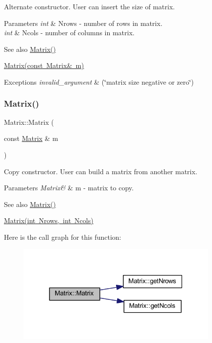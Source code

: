 Alternate constructor. User can insert the size of matrix. 
\begin{DoxyParams}{Parameters}
{\em int} & Nrows -\/ number of rows in matrix. \\
\hline
{\em int} & Ncols -\/ number of columns in matrix. \\
\hline
\end{DoxyParams}
\begin{DoxySeeAlso}{See also}
\mbox{\hyperlink{class_matrix_a2dba13c45127354c9f75ef576f49269b}{Matrix()}} 

\mbox{\hyperlink{class_matrix_a765f4dcb51b6829311cc3e7576388423}{Matrix(const Matrix\& m)}} 
\end{DoxySeeAlso}

\begin{DoxyExceptions}{Exceptions}
{\em invalid\+\_\+argument} & (\char`\"{}matrix size negative or zero\char`\"{}) \\
\hline
\end{DoxyExceptions}
\mbox{\label{class_matrix_a765f4dcb51b6829311cc3e7576388423}} 
\subsubsection{\texorpdfstring{Matrix()}{Matrix()}\hspace{0.1cm}{\footnotesize\ttfamily [3/3]}}
{\footnotesize\ttfamily Matrix\+::\+Matrix (\begin{DoxyParamCaption}\item[{const \mbox{\hyperlink{class_matrix}{Matrix}} \&}]{m }\end{DoxyParamCaption})}

Copy constructor. User can build a matrix from another matrix. 
\begin{DoxyParams}{Parameters}
{\em Matrix\&} & m -\/ matrix to copy. \\
\hline
\end{DoxyParams}
\begin{DoxySeeAlso}{See also}
\mbox{\hyperlink{class_matrix_a2dba13c45127354c9f75ef576f49269b}{Matrix()}} 

\mbox{\hyperlink{class_matrix_a135a15de1126d735bb95fcc839d739d7}{Matrix(int Nrows, int Ncols)}} 
\end{DoxySeeAlso}
Here is the call graph for this function\+:\nopagebreak
\begin{figure}[H]
\begin{center}
\leavevmode
\includegraphics[width=283pt]{class_matrix_a765f4dcb51b6829311cc3e7576388423_cgraph}
\end{center}
\end{figure}


